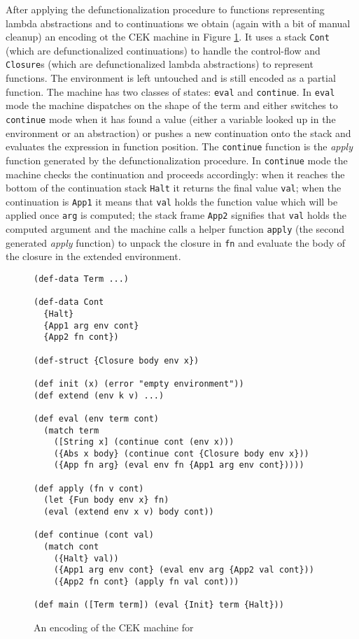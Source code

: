 After applying the defunctionalization procedure to functions representing lambda abstractions and to continuations we obtain (again with a bit of manual cleanup) an encoding ot the CEK machine \cite{Felleisen} in Figure \ref{fig:abstract-machine-cek}. 
It uses a stack \lstinline!Cont! (which are defunctionalized continuations) to handle the control-flow and \lstinline!Closure!s (which are defunctionalized lambda abstractions) to represent functions.
The environment is left untouched and is still encoded as a partial function.
The machine has two classes of states: \lstinline!eval! and \lstinline!continue!.
In \lstinline!eval! mode the machine dispatches on the shape of the term and either switches to \lstinline!continue! mode when it has found a value (either a variable looked up in the environment or an abstraction) or pushes a new continuation onto the stack and evaluates the expression in function position.
The \lstinline!continue! function is the \textit{apply} function generated by the defunctionalization procedure.
In \lstinline!continue! mode the machine checks the continuation and proceeds accordingly: when it reaches the bottom of the continuation stack \lstinline!Halt! it returns the final value \lstinline!val!; when the continuation is \lstinline!App1! it means that \lstinline!val! holds the function value which will be applied once \lstinline!arg! is computed; the stack frame \lstinline!App2! signifies that \lstinline!val! holds the computed argument and the machine calls a helper function \lstinline!apply! (the second generated \textit{apply} function) to unpack the closure in \lstinline!fn! and evaluate the body of the closure in the extended environment. 

\begin{figure}
\begin{lstlisting}
(def-data Term ...)

(def-data Cont
  {Halt}
  {App1 arg env cont}
  {App2 fn cont})

(def-struct {Closure body env x})

(def init (x) (error "empty environment"))
(def extend (env k v) ...)

(def eval (env term cont)
  (match term
    ([String x] (continue cont (env x)))
    ({Abs x body} (continue cont {Closure body env x}))
    ({App fn arg} (eval env fn {App1 arg env cont}))))

(def apply (fn v cont)
  (let {Fun body env x} fn)
  (eval (extend env x v) body cont))

(def continue (cont val)
  (match cont
    ({Halt} val))
    ({App1 arg env cont} (eval env arg {App2 val cont}))
    ({App2 fn cont} (apply fn val cont)))

(def main ([Term term]) (eval {Init} term {Halt}))
\end{lstlisting}
\caption{An encoding of the CEK machine for \LC{}}
\label{fig:abstract-machine-cek}
\end{figure}
